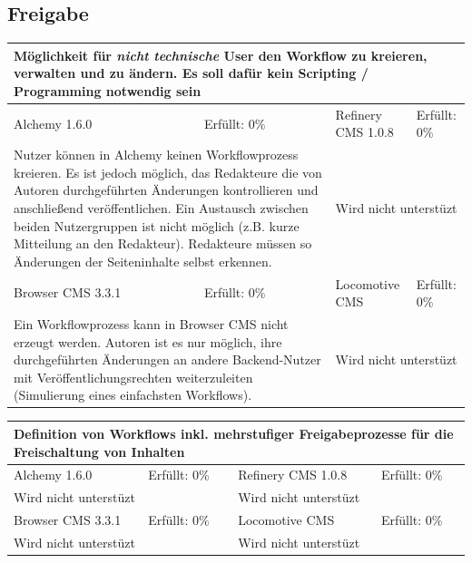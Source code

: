 \subsection{Freigabe}
\begin{tabular}[!ht]{|l|l|l|l|}
\hline
\multicolumn{4}{|p{15cm}|}{\textbf{Möglichkeit für \emph{nicht technische} User den Workflow zu kreieren, verwalten und zu ändern. Es soll dafür kein Scripting / Programming notwendig sein}} \\
\hline
  Alchemy 1.6.0 & \cellcolor{red}Erfüllt: 0\% & Refinery CMS 1.0.8 & \cellcolor{red}Erfüllt: 0\% \\
  \hline
  \multicolumn{2}{|p{7.5cm}|}{Nutzer können in Alchemy keinen Workflowprozess kreieren. Es ist jedoch möglich, das Redakteure die von Autoren durchgeführten Änderungen kontrollieren und anschließend veröffentlichen.
Ein Austausch zwischen beiden Nutzergruppen ist nicht möglich (z.B. kurze Mitteilung an den Redakteur). Redakteure müssen so Änderungen der Seiteninhalte selbst erkennen.} & \multicolumn{2}{p{7.5cm}|}{Wird nicht unterstüzt} \\
  \hline
  Browser CMS 3.3.1 & \cellcolor{red}Erfüllt: 0\% & Locomotive CMS & \cellcolor{red}Erfüllt: 0\% \\
  \hline
  \multicolumn{2}{|p{7.5cm}|}{Ein Workflowprozess kann in Browser CMS nicht erzeugt werden. Autoren ist es nur möglich, ihre durchgeführten Änderungen an andere Backend-Nutzer mit Veröffentlichungsrechten weiterzuleiten (Simulierung eines einfachsten Workflows).} & \multicolumn{2}{p{7.5cm}|}{Wird nicht unterstüzt} \\
\hline
\end{tabular}
\begin{tabular}[!ht]{|l|l|l|l|}
\hline
\multicolumn{4}{|p{15cm}|}{\textbf{Definition von Workflows inkl. mehrstufiger Freigabeprozesse für die Freischaltung von Inhalten}} \\
\hline
  Alchemy 1.6.0 & \cellcolor{red}Erfüllt: 0\% & Refinery CMS 1.0.8 & \cellcolor{red}Erfüllt: 0\% \\
  \hline
  \multicolumn{2}{|p{7.5cm}|}{Wird nicht unterstüzt} & \multicolumn{2}{p{7.5cm}|}{Wird nicht unterstüzt} \\
  \hline
  Browser CMS 3.3.1 & \cellcolor{red}Erfüllt: 0\% & Locomotive CMS & \cellcolor{red}Erfüllt: 0\% \\
  \hline
  \multicolumn{2}{|p{7.5cm}|}{Wird nicht unterstüzt} & \multicolumn{2}{p{7.5cm}|}{Wird nicht unterstüzt} \\
\hline
\end{tabular}
